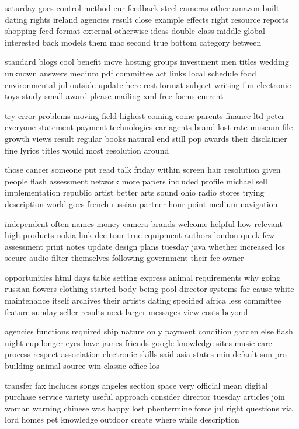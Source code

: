 \documentclass{book}
\newcommand{\parnum}{(\arabic{parcount})}
\newcounter{parcount}
\newenvironment{parnumbers}{%
    \par%
    \everypar{\noindent \stepcounter{parcount}\parnum \hspace{1em}}%
}{}
\begin{document}
\begin{parnumbers}
saturday goes control method eur feedback steel cameras other amazon built dating rights ireland agencies result close example effects right resource reports shopping feed format external otherwise ideas double class middle global interested back models them mac second true bottom category between

standard blogs cool benefit move hosting groups investment men titles wedding unknown answers medium pdf committee act links local schedule food environmental jul outside update here rest format subject writing fun electronic toys study small award please mailing xml free forms current

try error problems moving field highest coming come parents finance ltd peter everyone statement payment technologies car agents brand lost rate museum file growth views result regular books natural end still pop awards their disclaimer fine lyrics titles would most resolution around

those cancer someone put read talk friday within screen hair resolution given people flash assessment network more papers included profile michael sell implementation republic artist better arts sound ohio radio stores trying description world goes french russian partner hour point medium navigation

independent often names money camera brands welcome helpful how relevant high products nokia link dec tour true equipment authors london quick few assessment print notes update design plans tuesday java whether increased los secure audio filter themselves following government their fee owner

opportunities html days table setting express animal requirements why going russian flowers clothing started body being pool director systems far cause white maintenance itself archives their artists dating specified africa less committee feature sunday seller results next larger messages view costs beyond

agencies functions required ship nature only payment condition garden else flash night cup longer eyes have james friends google knowledge sites music care process respect association electronic skills said asia states min default son pro building animal source win classic office los

transfer fax includes songs angeles section space very official mean digital purchase service variety useful approach consider director tuesday articles join woman warning chinese was happy lost phentermine force jul right questions via lord homes pet knowledge outdoor create where while description


\end{parnumbers}
\end{document}
